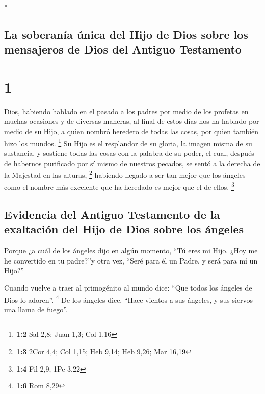 \begin{paracol}{2} \switchcolumn[0]*

\hypertarget{la-soberanuxeda-uxfanica-del-hijo-de-dios-sobre-los-mensajeros-de-dios-del-antiguo-testamento}{%
\subsection{La soberanía única del Hijo de Dios sobre los mensajeros de
Dios del Antiguo
Testamento}\label{la-soberanuxeda-uxfanica-del-hijo-de-dios-sobre-los-mensajeros-de-dios-del-antiguo-testamento}}

\hypertarget{section}{%
\section{1}\label{section}}

 Dios, habiendo hablado en el pasado a los padres por
medio de los profetas en muchas ocasiones y de diversas maneras,
 al final de estos días nos ha hablado por medio de su
Hijo, a quien nombró heredero de todas las cosas, por quien también hizo
los mundos. \footnote{\textbf{1:2} Sal 2,8; Juan 1,3; Col 1,16}
 Su Hijo es el resplandor de su gloria, la imagen misma de
su sustancia, y sostiene todas las cosas con la palabra de su poder, el
cual, después de habernos purificado por sí mismo de nuestros pecados,
se sentó a la derecha de la Majestad en las alturas, \footnote{\textbf{1:3}
  2Cor 4,4; Col 1,15; Heb 9,14; Heb 9,26; Mar 16,19} 
habiendo llegado a ser tan mejor que los ángeles como el nombre más
excelente que ha heredado es mejor que el de ellos. \footnote{\textbf{1:4}
  Fil 2,9; 1Pe 3,22}

\hypertarget{evidencia-del-antiguo-testamento-de-la-exaltaciuxf3n-del-hijo-de-dios-sobre-los-uxe1ngeles}{%
\subsection{Evidencia del Antiguo Testamento de la exaltación del Hijo
de Dios sobre los
ángeles}\label{evidencia-del-antiguo-testamento-de-la-exaltaciuxf3n-del-hijo-de-dios-sobre-los-uxe1ngeles}}

 Porque ¿a cuál de los ángeles dijo en algún momento, ``Tú
eres mi Hijo. ¿Hoy me he convertido en tu padre?''y otra vez, ``Seré
para él un Padre, y será para mí un Hijo?''

 Cuando vuelve a traer al primogénito al mundo dice: ``Que
todos los ángeles de Dios lo adoren''. \footnote{\textbf{1:6} Rom 8,29}
 De los ángeles dice, ``Hace vientos a sus ángeles, y sus
siervos una llama de fuego''.


\end{paracol}
